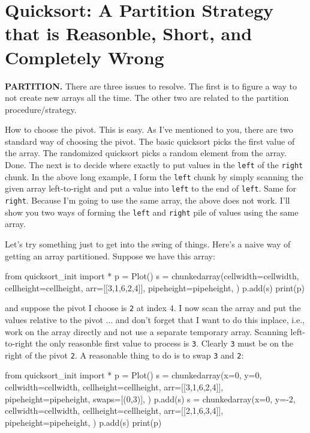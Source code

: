 \section{Quicksort: A
Partition Strategy that is Reasonble, Short,
and Completely Wrong}

\textbf{PARTITION.}
There are three issues to resolve.
The first is to figure a way to not create new arrays all the time.
The other two are related to the partition procedure/strategy.
\begin{itemize}
\li How to choose the pivot. This is easy. As I've mentioned to you,
there are two standard way of choosing the pivot.
The basic quicksort picks the first value of the array.
The randomized quicksort picks a random element from the array.
Done.
\li The next is to decide where exactly to put values in the
\verb!left! of the \verb!right! chunk.
In the above long example, I form the \verb!left! chunk by 
simply scanning the given array left-to-right and put a value into
\verb!left! to the end of \verb!left!.
Same for \verb!right!.
Because I'm going to use the same array, the above
does not work.
I'll show you two ways of forming the \verb!left! and \verb!right!
pile of values using the same array.
\end{itemize}




Let's try something just to get into the swing of things.
Here's a naive way of getting an array partitioned.
Suppose we have this array:
\begin{python}
from quicksort_init import *
p = Plot()
s = chunkedarray(cellwidth=cellwidth, 
                 cellheight=cellheight,
                 arr=[[3,1,6,2,4]],
                 pipeheight=pipeheight,
)
p.add(s)
print(p)
\end{python}
and suppose the pivot I choose is \verb!2!  at index 4.
I now scan the array and put the values relative to the pivot ...
and don't forget that I want to do this inplace, i.e., work on the 
array directly and not use a separate temporary array.
Scanning left-to-right the only reasonble first value to
process is \verb!3!.
Clearly \verb!3! must be on the right of the pivot \verb!2!.
A reasonable thing to do is to swap \verb!3! and \verb!2!:
\begin{python}
from quicksort_init import *
p = Plot()
s = chunkedarray(x=0, y=0, cellwidth=cellwidth, 
                   cellheight=cellheight,
                   arr=[[3,1,6,2,4]],
                   pipeheight=pipeheight,
                   swaps=[(0,3)],
)
p.add(s)
s = chunkedarray(x=0, y=-2, cellwidth=cellwidth, 
                   cellheight=cellheight,
                   arr=[[2,1,6,3,4]],
                   pipeheight=pipeheight,
)
p.add(s)
print(p)
\end{python}




